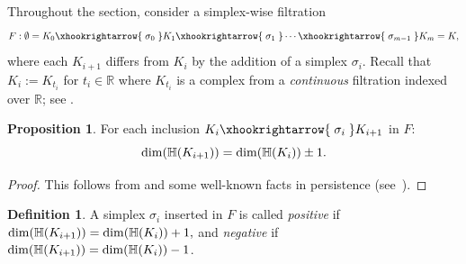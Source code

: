 \documentclass[10pt,a4paper]{amsart}
\newcommand {\mm}[1] {\ifmmode{#1}\else{\mbox{\(#1\)}}\fi}
\newcommand{\har}           {\mm{\mathbb{H}}}
\theoremstyle{definition}
\newcommand{\Tao}[1]{{\color{magenta}[#1]}}
\newcommand{\filt}{F}
\newcommand{\filtcnt}{m}
\newcommand{\fsimp}{\sigma}
\newcommand{\lbarrowspace}{\;}
\newcommand{\inctosp}[1]{\xhookrightarrow{\lbarrowspace#1\lbarrowspace}}
\newcommand{\Real}{\mathbb{R}}
\newtheorem{definition}[theorem]{Definition}
\newtheorem{proposition}[theorem]{Proposition}
\theoremstyle{remark}
\begin{document}
Throughout the  section,
consider a simplex-wise filtration
\begin{equation*}
\filt: 
\emptyset
=K_0 \inctosp{\fsimp_0} K_1 \inctosp{\fsimp_1} 
\cdots \inctosp{\fsimp_{\filtcnt-1}} K_\filtcnt=K,
\end{equation*}
where each $K_{i+1}$ differs from $K_i$
by the addition of a simplex $\fsimp_i$. 
Recall that $K_i := K_{t_i}$ for $t_i\in\Real$ where $K_{t_i}$
is a complex from a \emph{continuous} filtration indexed over $\Real$; see . 


\begin{proposition}
\label{prop:arrow-dim-change}
For each inclusion $K_i \inctosp{\fsimp_i} K_{i+1}$ in $\filt$: 
\[\dim(\har(K_{i+1}))=\dim(\har(K_{i})) \pm 1.\]
\end{proposition}
\begin{proof}
This follows from  and some well-known facts in persistence (see~\cite{DeyWang2022,EdelsbrunnerLetscherZomorodian2002}).
\end{proof}

\begin{definition}
\label{def:pos-neg-simp}
A simplex $\fsimp_i$ inserted in $\filt$ is called \emph{positive}
if $\dim(\har(K_{i+1}))=\dim(\har(K_{i}))+1,$ and \emph{negative}
if $\dim(\har(K_{i+1}))=\dim(\har(K_{i}))-1$.
\end{definition}
\end{document}
